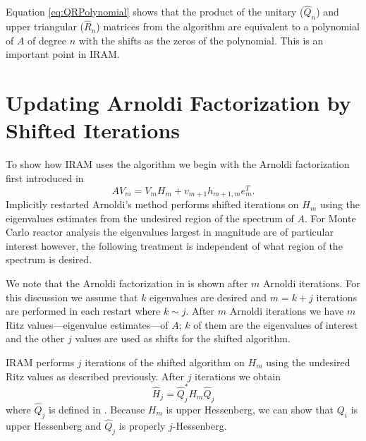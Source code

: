 Equation \eqref{eq:QRPolynomial} shows that the product of the unitary ($\hat{Q}_n$) and upper triangular ($\hat{R}_n$) matrices from the \QR algorithm are equivalent to a polynomial of $A$ of degree $n$ with the shifts as the zeros of the polynomial.  This is an important point in IRAM.

\section*{Updating Arnoldi Factorization by Shifted \QR Iterations}
To show how IRAM uses the \QR algorithm we begin with the Arnoldi factorization first introduced in 
\begin{equation}
    A V_m = V_mH_m + v_{m+1}h_{m+1,m}e_m^T.
    \label{eq:ArnoldiFactorizationIRAM}
\end{equation}
Implicitly restarted Arnoldi's method performs shifted \QR iterations on $H_m$ using the eigenvalues estimates from the undesired region of the spectrum of $A$.  For Monte Carlo reactor analysis the eigenvalues largest in magnitude are of particular interest however, the following treatment is independent of what region of the spectrum is desired.

We note that the Arnoldi factorization in  is shown after $m$ Arnoldi iterations.  For this discussion we assume that $k$ eigenvalues are desired and $m=k+j$ iterations are performed in each restart where $k \sim j$.  After $m$ Arnoldi iterations we have $m$ Ritz values---eigenvalue estimates---of $A$; $k$ of them are the eigenvalues of interest and the other $j$ values are used as shifts for the shifted \QR algorithm.

IRAM performs $j$ iterations of the shifted \QR algorithm on $H_m$ using the undesired Ritz values as described previously.  After $j$ iterations we obtain
\begin{equation}
    \hat{H}_j = \hat{Q}_j^*H_m\hat{Q}_j
    \label{eq:Hhat}
\end{equation}
where $\hat{Q}_j$ is defined in .  Because $H_m$ is upper Hessenberg, we can show that $Q_i$ is upper Hessenberg and $\hat{Q}_j$ is properly $j$-Hessenberg.  

